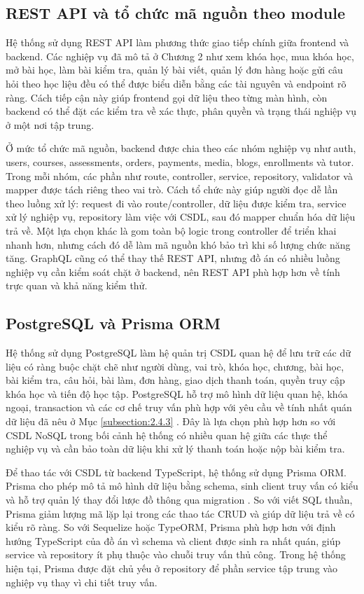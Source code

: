 \documentclass[../DoAn.tex]{subfiles}
\begin{document}
\subsection{REST API và tổ chức mã nguồn theo module}
\label{subsection:3.1.2}

Hệ thống sử dụng REST API làm phương thức giao tiếp chính giữa frontend và backend. Các nghiệp vụ đã mô tả ở Chương 2 như xem khóa học, mua khóa học, mở bài học, làm bài kiểm tra, quản lý bài viết, quản lý đơn hàng hoặc gửi câu hỏi theo học liệu đều có thể được biểu diễn bằng các tài nguyên và endpoint rõ ràng. Cách tiếp cận này giúp frontend gọi dữ liệu theo từng màn hình, còn backend có thể đặt các kiểm tra về xác thực, phân quyền và trạng thái nghiệp vụ ở một nơi tập trung.

Ở mức tổ chức mã nguồn, backend được chia theo các nhóm nghiệp vụ như auth, users, courses, assessments, orders, payments, media, blogs, enrollments và tutor. Trong mỗi nhóm, các phần như route, controller, service, repository, validator và mapper được tách riêng theo vai trò. Cách tổ chức này giúp người đọc dễ lần theo luồng xử lý: request đi vào route/controller, dữ liệu được kiểm tra, service xử lý nghiệp vụ, repository làm việc với CSDL, sau đó mapper chuẩn hóa dữ liệu trả về. Một lựa chọn khác là gom toàn bộ logic trong controller để triển khai nhanh hơn, nhưng cách đó dễ làm mã nguồn khó bảo trì khi số lượng chức năng tăng. GraphQL cũng có thể thay thế REST API, nhưng đồ án có nhiều luồng nghiệp vụ cần kiểm soát chặt ở backend, nên REST API phù hợp hơn về tính trực quan và khả năng kiểm thử.

\subsection{PostgreSQL và Prisma ORM}
\label{subsection:3.1.3}

Hệ thống sử dụng PostgreSQL làm hệ quản trị CSDL quan hệ để lưu trữ các dữ liệu có ràng buộc chặt chẽ như người dùng, vai trò, khóa học, chương, bài học, bài kiểm tra, câu hỏi, bài làm, đơn hàng, giao dịch thanh toán, quyền truy cập khóa học và tiến độ học tập. PostgreSQL hỗ trợ mô hình dữ liệu quan hệ, khóa ngoại, transaction và các cơ chế truy vấn phù hợp với yêu cầu về tính nhất quán dữ liệu đã nêu ở Mục \ref{subsection:2.4.3} \cite{postgresql_docs}. Đây là lựa chọn phù hợp hơn so với CSDL NoSQL trong bối cảnh hệ thống có nhiều quan hệ giữa các thực thể nghiệp vụ và cần bảo toàn dữ liệu khi xử lý thanh toán hoặc nộp bài kiểm tra.

Để thao tác với CSDL từ backend TypeScript, hệ thống sử dụng Prisma ORM. Prisma cho phép mô tả mô hình dữ liệu bằng schema, sinh client truy vấn có kiểu và hỗ trợ quản lý thay đổi lược đồ thông qua migration \cite{prisma_docs}. So với viết SQL thuần, Prisma giảm lượng mã lặp lại trong các thao tác CRUD và giúp dữ liệu trả về có kiểu rõ ràng. So với Sequelize hoặc TypeORM, Prisma phù hợp hơn với định hướng TypeScript của đồ án vì schema và client được sinh ra nhất quán, giúp service và repository ít phụ thuộc vào chuỗi truy vấn thủ công. Trong hệ thống hiện tại, Prisma được đặt chủ yếu ở repository để phần service tập trung vào nghiệp vụ thay vì chi tiết truy vấn.
\end{document}
